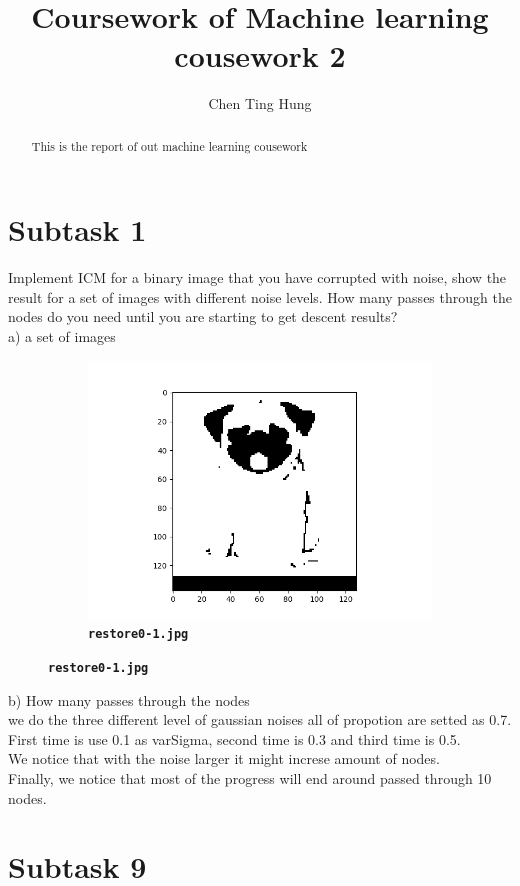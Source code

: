 \documentclass[12pt]{article}
\begin{document}
\title{Coursework of Machine learning cousework 2}



\author{Chen Ting Hung} {}
	
\maketitle

\begin{abstract}
This is the report of out machine learning cousework
\end{abstract}

\section{Subtask 1}
Implement ICM for a binary image that you have corrupted with noise, show the result for a set of images with different noise levels. How many passes through the nodes do you need until you are starting to get descent results?\\

a) a set of images\\
\begin{figure}[htb]
\centering
\begin{subfigure}[b]{.48\linewidth}
  \centering
  \includegraphics[width=\linewidth]{result/restore0-1.png}
  \caption{\textbf{\texttt{restore0-1.jpg}}}
\end{subfigure}
\label{fig:1}
\end{figure}

b) How many passes through the nodes\\
we do the three different level of gaussian noises all of propotion are setted as 0.7.\\ 
First time is use 0.1 as varSigma, second time is 0.3 and third time is 0.5.\\
We notice that with the noise larger it might increse amount of nodes.\\
Finally, we notice that most of the progress will end around passed through 10 nodes.\\

\section{Subtask 9}
\end{document}
